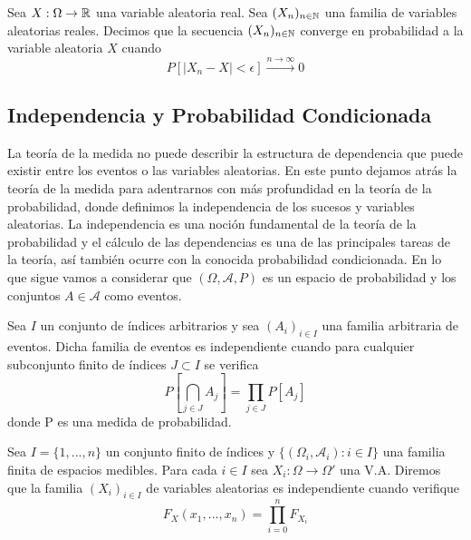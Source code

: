      
    \begin{definicion}
        Sea $X:\Omega \to \mathbb{R}$ una variable aleatoria real. Sea $(X_n)_{n\in \mathbb{N}}$ una familia de variables aleatorias reales. Decimos que la secuencia $(X_n)_{n\in \mathbb{N}}$ converge en probabilidad a la variable aleatoria $X$ cuando 
            \begin{equation}
                P[|X_n - X| < \epsilon] \xrightarrow{n\rightarrow\infty} 0
            \end{equation}  

    \end{definicion}
       
      
\subsection{Independencia y Probabilidad Condicionada}

    La teoría de la medida no puede describir la estructura de dependencia que puede existir entre los eventos o las variables aleatorias. En este punto dejamos atrás la teoría de la medida para adentrarnos con más profundidad en la teoría de la probabilidad, donde definimos la independencia de los sucesos y variables aleatorias. La independencia es una noción fundamental de la teoría de la probabilidad y el cálculo de las dependencias es una de las principales tareas de la teoría, así también ocurre con la conocida probabilidad condicionada. En lo que sigue vamos a considerar que $(\Omega,\mathcal{A},P)$ es un espacio de probabilidad y los conjuntos $A \in \mathcal{A}$ como eventos.\\
    
    
    \begin{definicion}
        Sea $I$ un conjunto de índices arbitrarios y sea $(A_i)_{i\in I}$ una familia arbitraria de eventos. Dicha familia de eventos es independiente cuando para cualquier subconjunto finito de índices $J \subset I$ se verifica
        $$ P[ \bigcap_{j \in J} A_j] = \prod_{j \in J} P[A_j] $$
        donde P es una medida de probabilidad.
    \end{definicion}    
    
    
    \begin{definicion}
     Sea  $I = \{1,...,n\}$ un conjunto finito de índices y $\{ (\Omega_i,\mathcal{A}_i) : i \in I \}$ una familia finita de espacios medibles. Para cada $i\in I$ sea $X_i:\Omega \to \Omega'$ una V.A. Diremos que la familia $(X_i)_{i \in I}$ de variables aleatorias es independiente cuando verifique
     $$ F_X(x_1,...,x_n) = \prod_{i=0}^n F_{X_i}$$
    \end{definicion}
    
